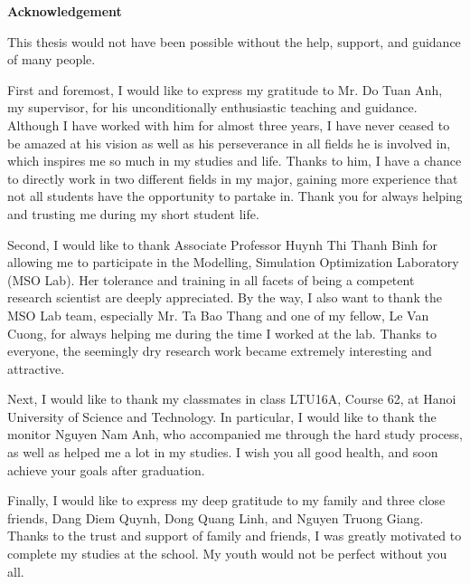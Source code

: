 \begin{center}
	{\fontsize{14}{16}\selectfont\textbf{Acknowledgement}}
\end{center}

This thesis would not have been possible without the help, support, and guidance of many people. 

First and foremost, I would like to express my gratitude to Mr. Do Tuan Anh, my supervisor, for his unconditionally enthusiastic teaching and guidance. Although I have worked with him for almost three years, I have never ceased to be amazed at his vision as well as his perseverance in all fields he is involved in, which inspires me so much in my studies and life. Thanks to him, I have a chance to directly work in two different fields in my major, gaining more experience that not all students have the opportunity to partake in. Thank you for always helping and trusting me during my short student life.

Second, I would like to thank Associate Professor Huynh Thi Thanh Binh for allowing me to participate in the Modelling, Simulation Optimization Laboratory (MSO Lab). Her tolerance and training in all facets of being a competent research scientist are deeply appreciated. By the way, I also want to thank the MSO Lab team, especially Mr. Ta Bao Thang and one of my fellow, Le Van Cuong, for always helping me during the time I worked at the lab. Thanks to everyone, the seemingly dry research work became extremely interesting and attractive. 

Next, I would like to thank my classmates in class LTU16A, Course 62, at Hanoi University of Science and Technology. In particular, I would like to thank the monitor Nguyen Nam Anh, who accompanied me through the hard study process, as well as helped me a lot in my studies. I wish you all good health, and soon achieve your goals after graduation.

Finally, I would like to express my deep gratitude to my family and three close friends, Dang Diem Quynh, Dong Quang Linh, and Nguyen Truong Giang. Thanks to the trust and support of family and friends, I was greatly motivated to complete my studies at the school. My youth would not be perfect without you all.
